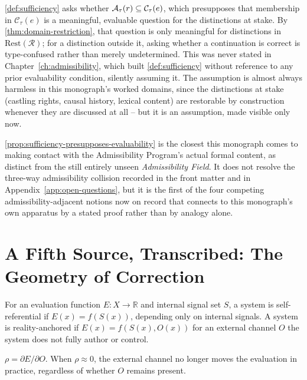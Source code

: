 \begin{proofsketch}
\cref{def:sufficiency} asks whether $\mathcal{A}_{\tau}(r) \subseteq
\mathcal{C}_\tau(e)$, which presupposes that membership in
$\mathcal{C}_\tau(e)$ is a meaningful, evaluable question for the
distinctions at stake. By \cref{thm:domain-restriction}, that question is
only meaningful for distinctions in $\mathrm{Rest}(\mathcal{R})$; for a
distinction outside it, asking whether a continuation is correct is
type-confused rather than merely undetermined. This was never stated in
Chapter~\ref{ch:admissibility}, which built \cref{def:sufficiency} without
reference to any prior evaluability condition, silently assuming it. The
assumption is almost always harmless in this monograph's worked domains,
since the distinctions at stake (castling rights, causal history, lexical
content) are restorable by construction whenever they are discussed at
all -- but it is an assumption, made visible only now.
\end{proofsketch}

\cref{prop:sufficiency-presupposes-evaluability} is the closest this
monograph comes to making contact with the Admissibility Program's actual
formal content, as distinct from the still entirely unseen
\emph{Admissibility Field}. It does not resolve the three-way
admissibility collision recorded in the front matter and in
Appendix~\ref{app:open-questions}, but it is the first of the four
competing admissibility-adjacent notions now on record that connects to
this monograph's own apparatus by a stated proof rather than by analogy
alone.

\section{A Fifth Source, Transcribed: The Geometry of Correction}
\label{sec:goc}


\begin{definition}
\label{def:evaluation-types}
For an evaluation function $E: X \to \mathbb{R}$ and internal signal set
$S$, a system is self-referential if $E(x) = f(S(x))$, depending only on
internal signals. A system is reality-anchored if $E(x) = f(S(x), O(x))$
for an external channel $O$ the system does not fully author or control.
\end{definition}

\begin{definition}
\label{def:coupling-coefficient}
$\rho = \partial E / \partial O$. When $\rho \approx 0$, the external
channel no longer moves the evaluation in practice, regardless of whether
$O$ remains present.
\end{definition}

